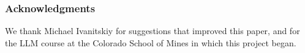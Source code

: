 \subsubsection*{Acknowledgments}
We thank Michael Ivanitskiy for suggestions that improved this paper, and for the LLM course at the Colorado School of Mines in which this project began.
